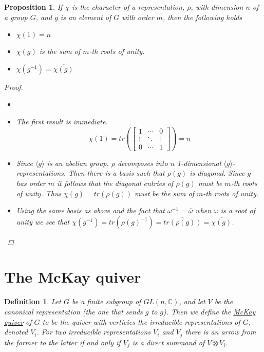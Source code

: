 \documentclass[11pt, a4paper, english]{article}
\newtheorem{prop}{Proposition}
\numberwithin{prop}{section}
\numberwithin{lemma}{section}
\numberwithin{theorem}{section}
\newtheorem{defin}{Definition}
\numberwithin{defin}{section}
\numberwithin{example}{section}
\newcommand{\C}{\mathbb{C}}
\begin{document}
\begin{prop}
If $\chi$ is the character of a representation, $\rho$, with dimension $n$ of a group $G$, and $g$ is an element of $G$ with order $m$, then the following holds
\begin{itemize}
 \item[(1)] $\chi(1) = n$
 \item[(2)] $\chi(g)$ is the sum of $m$-th roots of unity.
 \item[(3)] $\chi(g^{-1}) = \overline{\chi(g)}$
\end{itemize}
\begin{proof}

\begin{itemize}
\item[]
\item[(1)]
The first result is immediate.
$$\chi(1) = tr\left(\begin{bmatrix}
1 & \cdots & 0\\
\vdots & \ddots & \vdots\\
0 & \cdots & 1
\end{bmatrix}\right) = n$$
\item[(2)]
Since $\langle g \rangle$ is an abelian group, $\rho$ decomposes into $n$ 1-dimensional $\langle g \rangle$-representations. Then there is a basis such that $\rho(g)$ is diagonal. Since $g$ has order $m$ it follows that the diagonal entries of $\rho(g)$ must be $m$-th roots of unity. Thus $\chi(g) = tr(\rho(g))$ must be the sum of $m$-th roots of unity.
\item[(3)]
Using the same basis as above and the fact that $\omega^{-1} = \overline{\omega}$ when $\omega$ is a root of unity we see that $\chi(g^{-1}) = tr(\rho(g)^{-1}) = \overline{tr(\rho(g))} = \overline{\chi(g)}$.
\end{itemize}
\end{proof}
\end{prop}

\section{The McKay quiver}
\begin{defin}
Let $G$ be a finite subgroup of $GL(n, \C)$, and let $V$ be the canonical representation (the one that sends $g$ to $g$). Then we define the \underline{McKay quiver} of $G$ to be the quiver with verticies the irreducible representations of $G$, denoted $V_i$. For two irreducible representations $V_i$ and $V_j$ there is an arrow from the former to the latter if and only if $V_j$ is a direct summand of $V \otimes V_i$. 
\end{defin}
\end{document}
